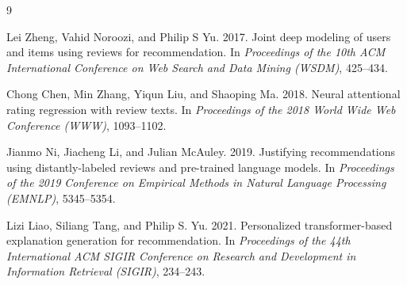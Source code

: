 \documentclass[11pt,a4paper]{article}
\begin{document}
\begin{thebibliography}{9}

Lei Zheng, Vahid Noroozi, and Philip S Yu. 2017.
\newblock Joint deep modeling of users and items using reviews for recommendation.
\newblock In {\em Proceedings of the 10th ACM International Conference on Web Search and Data Mining (WSDM)}, 425--434.

Chong Chen, Min Zhang, Yiqun Liu, and Shaoping Ma. 2018.
\newblock Neural attentional rating regression with review texts.
\newblock In {\em Proceedings of the 2018 World Wide Web Conference (WWW)}, 1093--1102.

Jianmo Ni, Jiacheng Li, and Julian McAuley. 2019.
\newblock Justifying recommendations using distantly-labeled reviews and pre-trained language models.
\newblock In {\em Proceedings of the 2019 Conference on Empirical Methods in Natural Language Processing (EMNLP)}, 5345--5354.

Lizi Liao, Siliang Tang, and Philip S. Yu. 2021.
\newblock Personalized transformer-based explanation generation for recommendation.
\newblock In {\em Proceedings of the 44th International ACM SIGIR Conference on Research and Development in Information Retrieval (SIGIR)}, 234--243.

\end{thebibliography}
\end{document}
